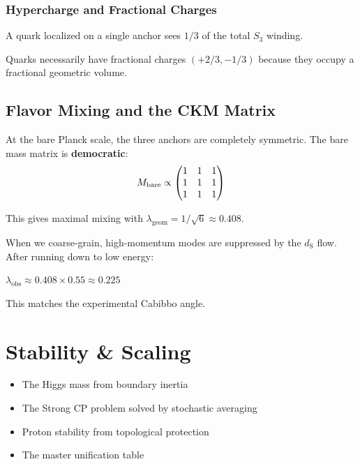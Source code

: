 \documentclass[11pt, a4paper, openany]{book}
\newcommand{\dS}{d_{\mathrm{S}}}
\newenvironment{introduction}[1][Chapter Overview]{%
  \begin{tcolorbox}[
    enhanced,
    colback=structurecolor!5,
    colframe=structurecolor,
    colbacktitle=structurecolor,
    coltitle=white,
    fonttitle=\bfseries,
    title={#1},
    arc=3pt, boxrule=1pt,
    left=10pt, right=10pt, top=8pt, bottom=8pt,
    before skip=15pt, after skip=15pt
  ]
  \begin{itemize}[leftmargin=*, itemsep=3pt]
}{%
  \end{itemize}
  \end{tcolorbox}
}
\begin{document}
\subsection{Hypercharge and Fractional Charges}

A quark localized on a single anchor sees $1/3$ of the total $S_3$ winding.

\begin{result}
Quarks necessarily have fractional charges $(+2/3, -1/3)$ because they occupy a fractional geometric volume.
\end{result}

\section{Flavor Mixing and the CKM Matrix}

At the bare Planck scale, the three anchors are completely symmetric.
The bare mass matrix is \textbf{democratic}:
\begin{equation}
M_{\rm bare} \propto \begin{pmatrix} 1 & 1 & 1 \\ 1 & 1 & 1 \\ 1 & 1 & 1 \end{pmatrix}
\end{equation}

This gives maximal mixing with $\lambda_{\text{geom}} = 1/\sqrt{6} \approx 0.408$.

When we coarse-grain, high-momentum modes are suppressed by the $\dS$ flow.
After running down to low energy:

\begin{result}
$\lambda_{\text{obs}} \approx 0.408 \times 0.55 \approx 0.225$

This matches the experimental Cabibbo angle.
\end{result}


\chapter{Stability \& Scaling}

\begin{introduction}
  \item The Higgs mass from boundary inertia
  \item The Strong CP problem solved by stochastic averaging
  \item Proton stability from topological protection
  \item The master unification table
\end{introduction}
\end{document}
